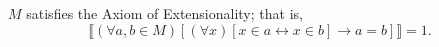 $M$ satisfies the Axiom of Extensionality; that is,
$$
\llbracket (\forall a, b \in M)[(\forall x)[x \in a \leftrightarrow x \in b] \to a = b] \rrbracket = 1.
$$
